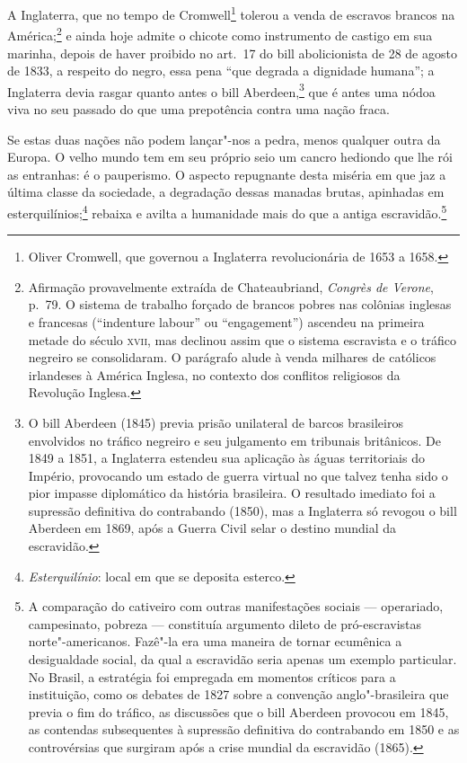  A Inglaterra, que no tempo de Cromwell\footnote{ Oliver Cromwell, 
que governou a Inglaterra revolucionária de 1653 a 1658.}
 tolerou a venda de escravos brancos na América;\footnote{ Afirmação provavelmente extraída de Chateaubriand, 
\textit{Congrès de Verone}, p.~79. O sistema de trabalho forçado de brancos pobres nas
colônias inglesas e francesas (``indenture labour'' ou ``engagement'')
ascendeu na primeira metade do século \textsc{xvii}, mas declinou assim que o
sistema escravista e o tráfico negreiro se consolidaram. O parágrafo
alude à venda milhares de católicos irlandeses à América Inglesa, no
contexto dos conflitos religiosos da Revolução Inglesa.} 
e ainda hoje admite o chicote como instrumento de castigo em sua
marinha, depois de haver proibido no art.~17 do bill abolicionista de
28 de agosto de 1833, a respeito do negro, essa pena ``que degrada a
dignidade humana''; a Inglaterra devia rasgar quanto antes o bill
Aberdeen,\footnote{ O bill Aberdeen (1845) previa prisão unilateral de barcos 
brasileiros envolvidos no tráfico negreiro e seu julgamento em tribunais britânicos. 
De 1849 a 1851, a Inglaterra estendeu sua aplicação às águas territoriais do Império, 
provocando um estado de guerra virtual no que talvez tenha sido o pior impasse diplomático 
da história brasileira. O resultado imediato foi a supressão definitiva do contrabando (1850), 
mas a Inglaterra só revogou o bill Aberdeen em 1869, após a Guerra Civil selar o destino mundial da escravidão.} 
que é antes uma nódoa viva no seu passado do que uma prepotência contra uma nação fraca.

 Se estas duas nações não podem lançar"-nos a pedra, menos qualquer
outra da Europa. O velho mundo tem em seu próprio seio um cancro
hediondo que lhe rói as entranhas: é o pauperismo. O aspecto repugnante
desta miséria em que jaz a última classe da sociedade, a degradação
dessas manadas brutas, apinhadas em
esterquilínios;\footnote{ \textit{Esterquilínio}: local em que se deposita esterco.} 
rebaixa e avilta a humanidade mais do que a antiga
escravidão.\footnote{ A comparação do cativeiro com outras manifestações sociais --- 
operariado, campesinato, pobreza --- constituía argumento dileto de pró-escravistas norte"-americanos. 
Fazê"-la era uma maneira de tornar ecumênica a desigualdade social, da qual a escravidão seria apenas 
um exemplo particular. No Brasil, a estratégia foi empregada em momentos críticos para a instituição, 
como os debates de 1827 sobre a convenção anglo"-brasileira que previa o fim do tráfico, as discussões 
que o bill Aberdeen provocou em 1845, as contendas subsequentes à supressão definitiva do contrabando 
em 1850 e as controvérsias que surgiram após a crise mundial da escravidão (1865).} 

